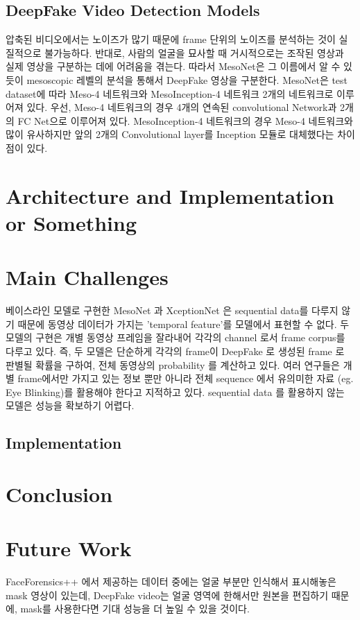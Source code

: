 \documentclass{article}
\begin{document}
		\subsection{DeepFake Video Detection Models}
		압축된 비디오에서는 노이즈가 많기 때문에 frame 단위의 노이즈를 분석하는 것이 실질적으로 불가능하다. 반대로, 사람의 얼굴을 묘사할 때 거시적으로는 조작된 영상과 실제 영상을 구분하는 데에 어려움을 겪는다. 따라서 MesoNet은 그 이름에서 알 수 있듯이 mesoscopic 레벨의 분석을 통해서 DeepFake 영상을 구분한다. MesoNet은 test dataset에 따라 Meso-4 네트워크와 MesoInception-4 네트워크 2개의 네트워크로 이루어져 있다. 우선, Meso-4 네트워크의 경우 4개의 연속된 convolutional Network과 2개의 FC Net으로 이루어져 있다. MesoInception-4 네트워크의 경우 Meso-4 네트워크와 많이 유사하지만 앞의 2개의 Convolutional layer를 Inception 모듈로 대체했다는 차이점이 있다.
	
	\section{Architecture and Implementation or Something}
	
	\section{Main Challenges}
	베이스라인 모델로 구현한 MesoNet 과 XceptionNet 은 sequential data를 다루지 않기 때문에 동영상 데이터가 가지는 'temporal feature'를 모델에서 표현할 수 없다. 두 모델의 구현은 개별 동영상 프레임을 잘라내어 각각의 channel 로서 frame corpus를 다루고 있다. 즉, 두 모델은 단순하게 각각의 frame이 DeepFake 로 생성된 frame 로 판별될 확률을 구하여, 전체 동영상의 probability 를 계산하고 있다. 여러 연구들은 개별 frame에서만 가지고 있는 정보 뿐만 아니라 전체 sequence 에서 유의미한 자료 (eg. Eye Blinking)를 활용해야 한다고 지적하고 있다. sequential data 를 활용하지 않는 모델은 성능을 확보하기 어렵다.
	
	\subsection{Implementation}
	
	
	
	\section{Conclusion}
	
	\section{Future Work}
	FaceForensics++ 에서 제공하는 데이터 중에는 얼굴 부분만 인식해서 표시해놓은 mask 영상이 있는데, DeepFake video는 얼굴 영역에 한해서만 원본을 편집하기 때문에, mask를 사용한다면 기대 성능을 더 높일 수 있을 것이다. 
	
\end{document}
